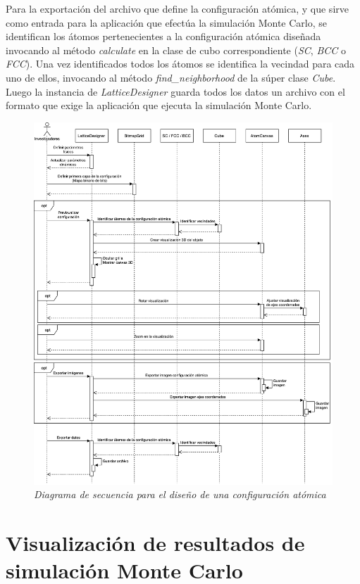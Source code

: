 Para la exportación del archivo que define la configuración atómica, y que sirve como entrada para la aplicación que efectúa la simulación Monte Carlo, se identifican los átomos pertenecientes a la configuración atómica diseñada invocando al método \emph{calculate} en la clase de cubo correspondiente (\emph{SC}, \emph{BCC} o \emph{FCC}). Una vez identificados todos los átomos se identifica la vecindad para cada uno de ellos, invocando al método \emph{find\_neighborhood} de la súper clase \emph{Cube}. Luego la instancia de \emph{LatticeDesigner} guarda todos los datos un archivo con el formato que exige la aplicación que ejecuta la simulación Monte Carlo.

\begin{figure}[ht]
  \centering
  \includegraphics[scale=.5]{images/DiagramaSecuenciaDiseno}
  \caption{\em Diagrama de secuencia para el diseño de una configuración atómica}
  \label{fig:DiagramaSecuenciaDiseno}
\end{figure}

\section{Visualización de resultados de simulación Monte Carlo}

